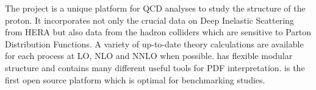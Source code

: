 
\label{sec:summary}
The \fitter project is a unique platform for QCD analyses to study the 
structure of the proton. It incorporates not only the crucial data on
Deep Inelastic Scattering from HERA but also data from the hadron colliders 
which are sensitive to Parton Distribution Functions. A variety of up-to-date 
theory calculations are available for each process at LO, NLO and NNLO 
when possible.  
\fitter has flexible modular structure and contains many different useful tools for PDF interpretation. 
\fitter is the first open source platform which is optimal for benchmarking studies.

